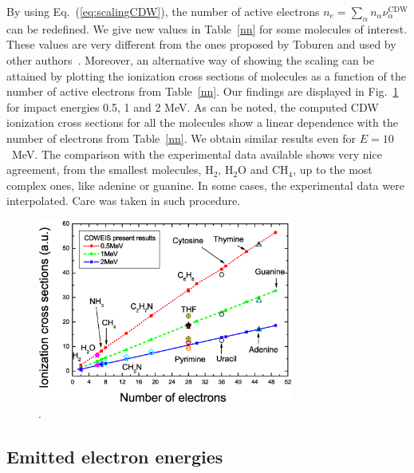 \documentclass[preprint,12pt]{article}
\begin{document}
By using Eq.~(\ref{eq:scalingCDW}), the number of active electrons 
$n_e=\sum_{\alpha} n_{\alpha} \nu_{\alpha}^{\text{CDW}}$ can be redefined. 
We give new values in Table~\ref{nn} for some molecules of interest.
These values are very different from the ones proposed by Toburen and used by 
other authors~\cite{itoh2013}.
Moreover, an alternative way of showing the scaling can be attained by 
plotting the ionization cross sections of molecules as a function of the 
number of active electrons from Table~\ref{nn}. Our findings are displayed 
in Fig.~\ref{fig:recta} for impact energies 0.5, 1 and 2 MeV. As can be 
noted, the computed CDW ionization cross sections for all the molecules  
show a linear dependence with the number of electrons from Table~\ref{nn}. 
We obtain similar results even for $E=10$~MeV. The comparison with the 
experimental data available shows very nice agreement, from the smallest 
molecules, H$_2$, H$_2$O and CH$_4$, up to the most complex ones, like 
adenine or guanine. In some cases, the experimental data were interpolated.
Care was taken in such procedure.

\begin{figure}[t!]
\centering
\includegraphics[width=0.75\textwidth]{figuras/fig_recta.eps}
\caption{.}
\label{fig:recta}
\end{figure}

\subsection{Emitted electron energies}
\end{document}
